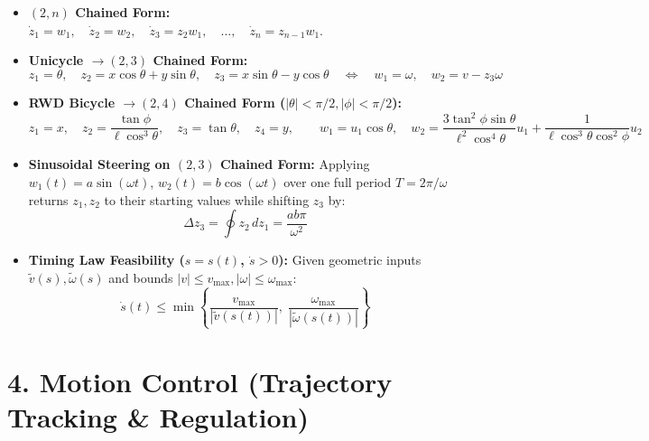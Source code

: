 \documentclass[10pt, a4paper]{article}
\begin{document}
\begin{itemize}
    \item \textbf{$(2,n)$ Chained Form:} $\dot{z}_1 = w_1, \quad \dot{z}_2 = w_2, \quad \dot{z}_3 = z_2 w_1, \quad \dots, \quad \dot{z}_n = z_{n-1} w_1$.
    \item \textbf{Unicycle $\to (2,3)$ Chained Form:}
    \[
        z_1 = \theta, \quad z_2 = x\cos\theta + y\sin\theta, \quad z_3 = x\sin\theta - y\cos\theta \quad \Longleftrightarrow \quad w_1 = \omega, \quad w_2 = v - z_3\omega
    \]
    \item \textbf{RWD Bicycle $\to (2,4)$ Chained Form ($|\theta| < \pi/2, |\phi| < \pi/2$):}
    \[
        z_1 = x, \quad z_2 = \frac{\tan\phi}{\ell\cos^3\theta}, \quad z_3 = \tan\theta, \quad z_4 = y, \qquad w_1 = u_1\cos\theta, \quad w_2 = \frac{3\tan^2\phi\sin\theta}{\ell^2\cos^4\theta}u_1 + \frac{1}{\ell\cos^3\theta\cos^2\phi}u_2
    \]
    \item \textbf{Sinusoidal Steering on $(2,3)$ Chained Form:} Applying $w_1(t) = a\sin(\omega t)$, $w_2(t) = b\cos(\omega t)$ over one full period $T = 2\pi/\omega$ returns $z_1, z_2$ to their starting values while shifting $z_3$ by:
    \[
        \Delta z_3 = \oint z_2\,dz_1 = \frac{ab\pi}{\omega^2}
    \]
    \item \textbf{Timing Law Feasibility ($s = s(t)$, $\dot{s} > 0$):} Given geometric inputs $\tilde{v}(s), \tilde{\omega}(s)$ and bounds $|v| \le v_{\max}, |\omega| \le \omega_{\max}$:
    \[
        \dot{s}(t) \le \min\left\{ \frac{v_{\max}}{|\tilde{v}(s(t))|}, \; \frac{\omega_{\max}}{|\tilde{\omega}(s(t))|} \right\}
    \]
\end{itemize}

\section*{4. Motion Control (Trajectory Tracking \& Regulation)}
\end{document}
